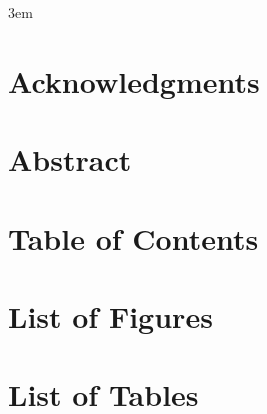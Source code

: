 \documentclass[10pt,twoside]{book}
\begin{document}
\emergencystretch 3em

\frontmatter



\chapter{Acknowledgments}

\clearpage

\chapter{Abstract}

\clearpage

\chapter{Table of Contents}
\tableofcontents %
\clearpage

\chapter{List of Figures}
\listoffigures
\clearpage

\chapter{List of Tables}
\listoftables
\clearpage

% 



% 


% 

\end{document}
